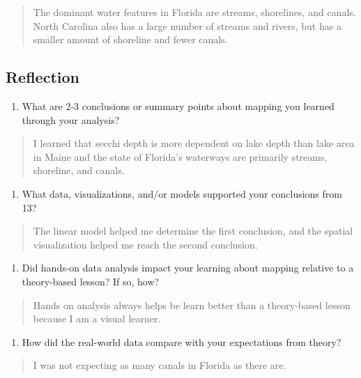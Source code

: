 \documentclass[]{article}
\providecommand{\tightlist}{%
  \setlength{\itemsep}{0pt}\setlength{\parskip}{0pt}}
\begin{document}
\begin{quote}
The dominant water features in Florida are streams, shorelines, and
canals. North Carolina also has a large number of streams and rivers,
but has a smaller amount of shoreline and fewer canals.
\end{quote}

\hypertarget{reflection}{%
\subsection{Reflection}\label{reflection}}

\begin{enumerate}
\def\labelenumi{\arabic{enumi}.}
\setcounter{enumi}{12}
\tightlist
\item
  What are 2-3 conclusions or summary points about mapping you learned
  through your analysis?
\end{enumerate}

\begin{quote}
I learned that secchi depth is more dependent on lake depth than lake
area in Maine and the state of Florida's waterways are primarily
streams, shoreline, and canals.
\end{quote}

\begin{enumerate}
\def\labelenumi{\arabic{enumi}.}
\setcounter{enumi}{13}
\tightlist
\item
  What data, visualizations, and/or models supported your conclusions
  from 13?
\end{enumerate}

\begin{quote}
The linear model helped me determine the first conclusion, and the
spatial visualization helped me reach the second conclusion.
\end{quote}

\begin{enumerate}
\def\labelenumi{\arabic{enumi}.}
\setcounter{enumi}{14}
\tightlist
\item
  Did hands-on data analysis impact your learning about mapping relative
  to a theory-based lesson? If so, how?
\end{enumerate}

\begin{quote}
Hands on analysis always helps be learn better than a theory-based
lesson because I am a visual learner.
\end{quote}

\begin{enumerate}
\def\labelenumi{\arabic{enumi}.}
\setcounter{enumi}{15}
\tightlist
\item
  How did the real-world data compare with your expectations from
  theory?
\end{enumerate}

\begin{quote}
I was not expecting as many canals in Florida as there are.
\end{quote}
\end{document}
